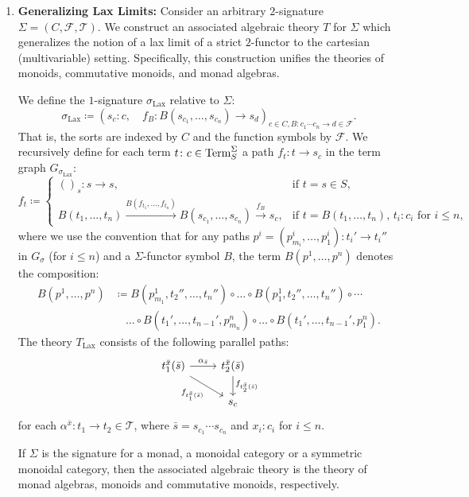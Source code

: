 \begin{examples}
\begin{enumerate}
\item \textbf{Generalizing Lax Limits:}
    Consider an arbitrary $2$-signature $\Sigma = (C,\mathcal{F},\mathcal{T})$. We construct an associated algebraic theory $T$ for $\Sigma$ which generalizes the notion of a lax limit of a strict $2$-functor \cite{streetLimitsIndexedCategoryvalued1976, lack2CategoriesCompanion2010} to the cartesian (multivariable) setting. Specifically, this construction unifies the theories of monoids, commutative monoids, and monad algebras.

    We define the $1$-signature $\sigma_{\text{Lax}}$ relative to $\Sigma$:
    \[
    \sigma_{\text{Lax}} \coloneqq \left(s_c\colon c, \quad f_B\colon B(s_{c_1},\dots, s_{c_n})\to s_d\right)_{c\in C,B\colon c_1\cdots c_n\to d\in\mathcal{F}}.
    \]
    That is, the sorts are indexed by $C$ and the function symbols by $\mathcal{F}$. We recursively define for each term $t \colon c \in \mathrm{Term}_S^\Sigma$ a path $f_t \colon t \to s_c$ in the term graph $G_{\sigma_{\text{Lax}}}$:
    {\small
    \[
    f_t\coloneqq \begin{cases}
        ()_{s}\colon s\to s, & \text{if $t = s\in S$,}\\
        B(t_1, \dots, t_n) \xrightarrow{B(f_{t_1}, \dots, f_{t_n})} B(s_{c_1}, \dots, s_{c_n}) \xrightarrow{f_B} s_c, & \text{if $t = B(t_1,\dots, t_n)$, $t_i\colon c_i$ for $i\leq n$,}
    \end{cases}
    \]
    }
    where we use the convention that for any paths $p^i = (p^i_{m_i},\dots, p^i_1)\colon t_i'\to t_i''$ in $G_\sigma$ (for $i\leq n$) and a $\Sigma$-functor symbol $B$, the term $B(p^1, \dots, p^n)$ denotes the composition:
    \begin{align*}
        B(p^1,\dots, p^n) &\coloneqq B(p^1_{m_1},t_2'',\dots, t_n'')\circ\dots\circ B(p^1_1,t_2'',\dots, t_n'') \circ \cdots \\
        &\quad \dots \circ B(t_1',\dots, t_{n-1}',p^n_{m_n})\circ\dots\circ B(t_1',\dots, t_{n-1}', p^n_1).
    \end{align*}
    The theory $T_{\text{Lax}}$ consists of the following parallel paths:
    \[
    \begin{tikzcd}
    t_1^{\bar{x}}(\bar{s}) \arrow[r, "\alpha_{\bar{s}}"] \arrow[rd, "f_{t_1^{\bar{x}}(\bar{s})}"'] & t_2^{\bar{x}}(\bar{s}) \arrow[d, "f_{t_2^{\bar{x}}(\bar{s})}"] \\
                                                                                                   & s_c
    \end{tikzcd}
    \]
    for each $\alpha^{\bar{x}}\colon t_1\to t_2\in \mathcal{T}$, where $\bar{s} = s_{c_1}\cdots s_{c_n}$ and $x_i\colon c_i$ for $i\leq n$.

    If $\Sigma$ is the signature for a monad, a monoidal category or a symmetric monoidal category, then the associated algebraic theory is the theory of monad algebras, monoids and commutative monoids, respectively.
       \end{enumerate}

\end{examples}
